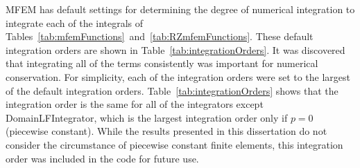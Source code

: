 \documentclass{article}
\begin{document}
\begin{sidewaystable}[!h]
\caption{MFEM \RZ\ transport operator function calls where the arguments have been dropped.}
\label{tab:RZmfemFunctions}
\end{sidewaystable}

MFEM has default settings for determining the degree of numerical integration to integrate each of the integrals of Tables~\ref{tab:mfemFunctions}~and~\ref{tab:RZmfemFunctions}. These default integration orders are shown in Table~\ref{tab:integrationOrders}. It was discovered that integrating all of the terms consistently was important for numerical conservation. For simplicity, each of the integration orders were set to the largest of the default integration orders. Table~\ref{tab:integrationOrders} shows that the integration order is the same for all of the integrators except DomainLFIntegrator, which is the largest integration order only if $p = 0$ (piecewise constant). While the results presented in this dissertation do not consider the circumstance of piecewise constant finite elements, this integration order was included in the code for future use.
\end{document}
